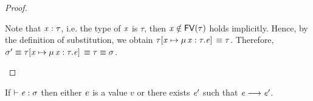 \begin{proof}
\begin{description}
        Note that $\mathit{x}:\tau$, i.e. the type of $\mathit{x}$ is $\tau$, then
$\mathit{x} \notin \mathsf{FV}(\tau)$ holds implicitly. Hence, by the definition of
substitution, we obtain $\tau  [  \mathit{x}  \mapsto  \mu \, \mathit{x}  :  \tau  .  \mathit{e}  ] \,  \equiv  \tau$. Therefore, $\sigma'  \equiv  \tau  [  \mathit{x}  \mapsto  \mu \, \mathit{x}  :  \tau  .  \mathit{e}  ] \,  \equiv  \tau  \equiv  \sigma$.
    \end{description}
\end{proof}

\begin{lem}[Progress]
If $\vdash  \mathit{e}  :  \sigma$ then either $\mathit{e}$ is a value $v$ or there exists $\mathit{e}'$
such that $\mathit{e}  \longrightarrow  \mathit{e'}$.
\end{lem}

